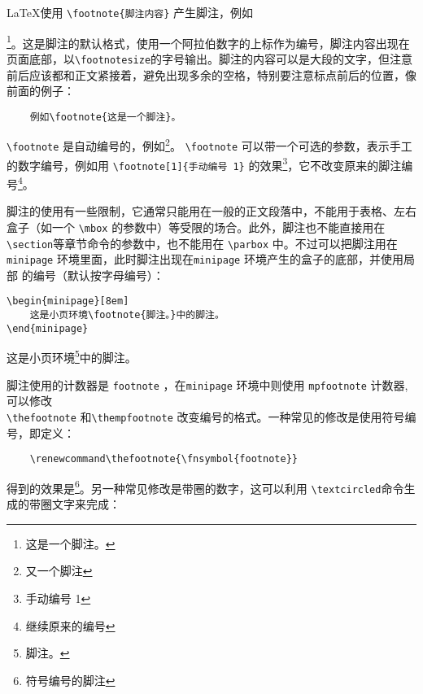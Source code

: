 \LaTeX 使用 \verb|\footnote{脚注内容}| 产生脚注，例如{
    \setcounter{footnote}{0}
    \renewcommand*{\thefootnote}{\arabic{footnote}} \footnote{这是一个脚注。}。这是脚注的默认格式，使用一个阿拉伯数字的上标作为编号，脚注内容出现在页面底部，以\verb|\footnotesize|的字号输出。脚注的内容可以是大段的文字，但注意前后应该都和正文紧接着，避免出现多余的空格，特别要注意标点前后的位置，像前面的例子：
\begin{lstlisting}
    例如\footnote{这是一个脚注}。
\end{lstlisting}

\verb|\footnote| 是自动编号的，例如\footnote{又一个脚注}。 \verb|\footnote| 可以带一个可选的参数，表示手工的数字编号，例如用 \verb|\footnote[1]{手动编号 1}| 的效果\footnote[1]{手动编号 1}，它不改变原来的脚注编号\footnote{继续原来的编号}。

脚注的使用有一些限制，它通常只能用在一般的正文段落中，不能用于表格、左右盒子（如一个 \verb|\mbox| 的参数中）等受限的场合。此外，脚注也不能直接用在 \verb|\section|等章节命令的参数中，也不能用在 \verb|\parbox| 中。不过可以把脚注用在\verb|minipage| 环境里面，此时脚注出现在\verb|minipage| 环境产生的盒子的底部，并使用局部
的编号（默认按字母编号）：

\begin{minipage}[t]{0.45\textwidth}
\begin{lstlisting}
\begin{minipage}[8em]
    这是小页环境\footnote{脚注。}中的脚注。
\end{minipage}
\end{lstlisting}
\end{minipage}
\hfill
\begin{minipage}[t]{0.45\textwidth}
    这是小页环境\footnote{脚注。}中的脚注。
\end{minipage}

脚注使用的计数器是 \verb|footnote| ，在\verb|minipage| 环境中则使用 \verb|mpfootnote| 计数器,可以修改\\ \verb|\thefootnote| 和\verb|\thempfootnote| 改变编号的格式。一种常见的修改是使用符号编号，即定义：
\begin{lstlisting}
    \renewcommand\thefootnote{\fnsymbol{footnote}}
\end{lstlisting}

\renewcommand\thefootnote{\fnsymbol{footnote}} 

得到的效果是\footnote{符号编号的脚注}。另一种常见修改是带圈的数字，这可以利用 \verb|\textcircled|命令生成的带圈文字来完成：

}
